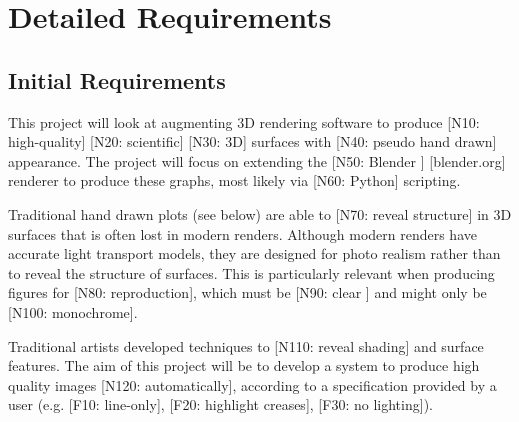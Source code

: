 \chapter{Detailed Requirements}\label{appendix_requirements}

\section{Initial Requirements}\label{initial-requirements}

This project will look at augmenting 3D rendering software to produce
{[}N10: high-quality{]} {[}N20: scientific{]} {[}N30: 3D{]} surfaces
with {[}N40: pseudo hand drawn{]} appearance. The project will focus on
extending the {[}N50: Blender {]} {[}blender.org{]} renderer to produce
these graphs, most likely via {[}N60: Python{]} scripting.

Traditional hand drawn plots (see below) are able to {[}N70: reveal
structure{]} in 3D surfaces that is often lost in modern renders.
Although modern renders have accurate light transport models, they are
designed for photo realism rather than to reveal the structure of
surfaces. This is particularly relevant when producing figures for
{[}N80: reproduction{]}, which must be {[}N90: clear {]} and might only
be {[}N100: monochrome{]}.

Traditional artists developed techniques to {[}N110: reveal shading{]}
and surface features. The aim of this project will be to develop a
system to produce high quality images {[}N120: automatically{]},
according to a specification provided by a user (e.g. {[}F10:
line-only{]}, {[}F20: highlight creases{]}, {[}F30: no lighting{]}).

